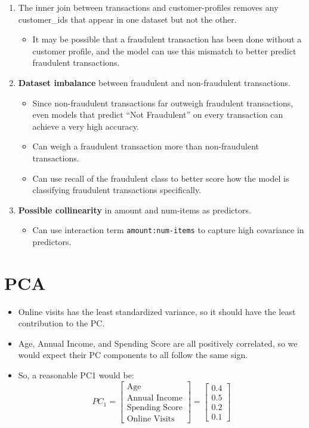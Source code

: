 \documentclass{article}
\begin{document}
\begin{enumerate}
    \item The inner join between transactions and customer-profiles removes any customer\_ids that appear in one dataset but not the other.
    \begin{itemize}
        \item It may be possible that a fraudulent transaction has been done without a customer profile, and the model can use this mismatch to better predict fraudulent transactions.
    \end{itemize}

    \item \textbf{Dataset imbalance} between fraudulent and non-fraudulent transactions.
    \begin{itemize}
        \item Since non-fraudulent transactions far outweigh fraudulent transactions, even models that predict ``Not Fraudulent'' on every transaction can achieve a very high accuracy.
        \item Can weigh a fraudulent transaction more than non-fraudulent transactions.
        \item Can use recall of the fraudulent class to better score how the model is classifying fraudulent transactions specifically.
    \end{itemize}

    \item \textbf{Possible collinearity} in amount and num-items as predictors.
    \begin{itemize}
        \item Can use interaction term \texttt{amount:num-items} to capture high covariance in predictors.
    \end{itemize}
\end{enumerate}

\section{PCA}

\begin{itemize}
    \item Online visits has the least standardized variance, so it should have the least contribution to the PC.

    \item Age, Annual Income, and Spending Score are all positively correlated, so we would expect their PC components to all follow the same sign.

    \item So, a reasonable PC1 would be:
    \[
        PC_1 = \begin{bmatrix} \text{Age} \\ \text{Annual Income} \\ \text{Spending Score} \\ \text{Online Visits} \end{bmatrix} = \begin{bmatrix} 0.4 \\ 0.5 \\ 0.2 \\ 0.1 \end{bmatrix}
    \]
\end{itemize}
\end{document}

